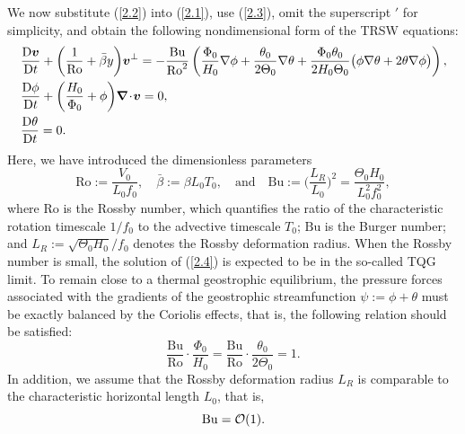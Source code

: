 \documentclass[a4paper,11pt,twoside]{article}
\numberwithin{equation}{section}
\numberwithin{figure}{section}
\numberwithin{table}{section}
\newcommand{\bnabla}{\bm{\nabla}}
\newcommand{\bv}{\bm{v}}
\newcommand{\Ro}{\mathrm{Ro}}
\newcommand{\Bu}{\mathrm{Bu}}
\newcommand\eref[1]{(\ref{#1})}
\begin{document}
We now substitute \eref{2.2} into \eref{2.1}, use \eref{2.3}, omit the superscript $'$ for simplicity, and obtain the following
nondimensional form of the TRSW equations:
\begin{equation}
\begin{aligned}
&\frac{{\rm D}\bv}{{\rm D}t}+\bigg(\frac{1}{\Ro}+\bar{\beta}y\bigg)\bv^\perp=-\frac{\Bu}{\Ro^2}\left(\frac{\Phi_0}{H_0}\nabla\phi
+\frac{\theta_0}{2\Theta_0}\nabla\theta+\frac{\Phi_0\theta_0}{2H_0\Theta_0}\big(\phi\nabla\theta+2\theta\nabla\phi\big)\right),\\
&\frac{{\rm D}\phi}{{\rm D}t}+\bigg(\frac{H_0}{\Phi_0}+\phi\bigg)\bnabla\!\cdot\!\bv=0,\\
&\frac{{\rm D}\theta}{{\rm D}t}=0.
\end{aligned}
\label{2.4}
\end{equation}
Here, we have introduced the dimensionless parameters
\begin{equation}
\Ro:=\frac{V_0}{L_0f_0},\quad\bar\beta:=\beta L_0T_0,\quad\mbox{and}\quad\Bu:=\bigg(\frac{L_R}{L_0}\bigg)^2=\frac{\Theta_0H_0}{L_0^2f_0^2},
\label{2.5}
\end{equation}
where $\Ro$ is the Rossby number, which quantifies the ratio of the characteristic rotation timescale $1/f_0$ to the advective timescale
$T_0$; $\Bu$ is the Burger number; and $L_R:=\sqrt{\Theta_0H_0}/f_0$ denotes the Rossby deformation radius. When the Rossby number is small,
the solution of \eref{2.4} is expected to be in the so-called TQG limit. To remain close to a thermal geostrophic equilibrium, the pressure
forces associated with the gradients of the geostrophic streamfunction $\psi:=\phi+\theta$ must be exactly balanced by the Coriolis effects,
that is, the following relation should be satisfied:
\begin{equation}
\frac{\Bu}{\Ro}\cdot\frac{\Phi_0}{H_0}=\frac{\Bu}{\Ro}\cdot\frac{\theta_0}{2\Theta_0}=1.
\label{2.6}
\end{equation}
In addition, we assume that the Rossby deformation radius $L_R$ is comparable to the characteristic horizontal length $L_0$, that is,
\begin{equation}
\Bu={\cal O}(1).
\label{2.7}
\end{equation}
\end{document}
